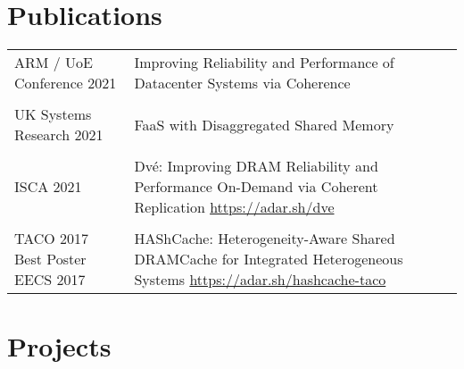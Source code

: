 \documentclass[a4paper,10pt]{article} %
\begin{document}
\section{Publications}
\begin{tabular}{p{3cm}p{11cm}}
ARM / UoE Conference 2021 & Improving Reliability and Performance of Datacenter Systems via \newline Coherence \\	
&\\
UK Systems \newline Research 2021 & FaaS with Disaggregated Shared Memory \\
& \\
ISCA 2021 & Dv\'e: Improving DRAM Reliability and Performance On-Demand via \newline Coherent Replication \hfill  \href{https://adar.sh/dve}{https://adar.sh/dve}\\
&\\
TACO 2017 \newline \footnotesize{Best Poster EECS 2017} & HAShCache: Heterogeneity-Aware Shared DRAMCache for Integrated Heterogeneous Systems  \hfill
\href{https://adar.sh/hashcache-taco}{https://adar.sh/hashcache-taco}
\\
\end{tabular}

\section{Projects}
\end{document}
